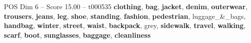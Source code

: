 \begin{textsample}{POS Dim 6 – Score 15.00 – t000535}  \label{ex:f6_pos_002}
\textbf{clothing}, \textbf{bag}, \textbf{jacket}, \textbf{denim}, \textbf{outerwear}, \textbf{trousers}, \textbf{jeans}, \textbf{leg}, \textbf{shoe}, \textbf{standing}, \textbf{fashion}, \textbf{pedestrian}, luggage\_\&\_bags, \textbf{handbag}, \textbf{winter}, \textbf{street}, \textbf{waist}, \textbf{backpack}, grey, \textbf{sidewalk}, \textbf{travel}, \textbf{walking}, \textbf{scarf}, \textbf{boot}, \textbf{sunglasses}, \textbf{baggage}, \textbf{cleanliness}

\end{textsample}
